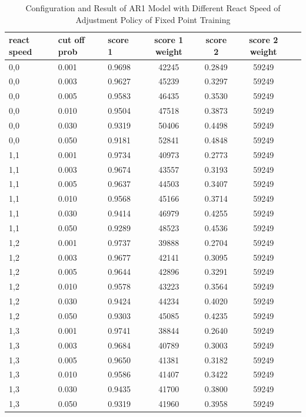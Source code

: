 \documentclass{article}
\begin{document}
\begin{longtable}[htbp]{l|l|l|*{4}{c}}
    \caption{Configuration and Result of AR1 Model with Different React Speed of Adjustment Policy of Fixed Point Training}
    \label{tab:tab1.8.2} \\
    \textbf{react speed} & \textbf{cut off prob} & \textbf{score 1} & \textbf{score 1 weight} & \textbf{score 2} & \textbf{score 2 weight} \\
    \hline
    0,0 & 0.001 & 0.9698 & 42245 & 0.2849 & 59249\\
    0,0 & 0.003 & 0.9627 & 45239 & 0.3297 & 59249\\
    0,0 & 0.005 & 0.9583 & 46435 & 0.3530 & 59249\\
    0,0 & 0.010 & 0.9504 & 47518 & 0.3873 & 59249\\
    0,0 & 0.030 & 0.9319 & 50406 & 0.4498 & 59249\\
    0,0 & 0.050 & 0.9181 & 52841 & 0.4848 & 59249\\
    1,1 & 0.001 & 0.9734 & 40973 & 0.2773 & 59249\\
    1,1 & 0.003 & 0.9674 & 43557 & 0.3193 & 59249\\
    1,1 & 0.005 & 0.9637 & 44503 & 0.3407 & 59249\\
    1,1 & 0.010 & 0.9568 & 45166 & 0.3714 & 59249\\
    1,1 & 0.030 & 0.9414 & 46979 & 0.4255 & 59249\\
    1,1 & 0.050 & 0.9289 & 48523 & 0.4536 & 59249\\
    1,2 & 0.001 & 0.9737 & 39888 & 0.2704 & 59249\\
    1,2 & 0.003 & 0.9677 & 42141 & 0.3095 & 59249\\
    1,2 & 0.005 & 0.9644 & 42896 & 0.3291 & 59249\\
    1,2 & 0.010 & 0.9578 & 43223 & 0.3564 & 59249\\
    1,2 & 0.030 & 0.9424 & 44234 & 0.4020 & 59249\\
    1,2 & 0.050 & 0.9303 & 45085 & 0.4235 & 59249\\
    1,3 & 0.001 & 0.9741 & 38844 & 0.2640 & 59249\\
    1,3 & 0.003 & 0.9684 & 40789 & 0.3003 & 59249\\
    1,3 & 0.005 & 0.9650 & 41381 & 0.3182 & 59249\\
    1,3 & 0.010 & 0.9586 & 41407 & 0.3422 & 59249\\
    1,3 & 0.030 & 0.9435 & 41700 & 0.3800 & 59249\\
    1,3 & 0.050 & 0.9319 & 41960 & 0.3958 & 59249\\

\end{longtable}
\end{document}
